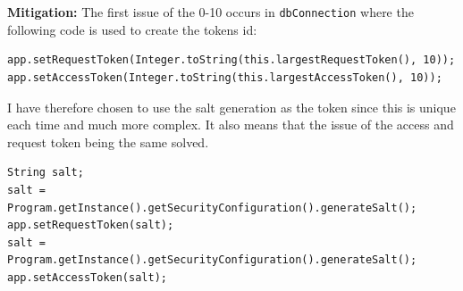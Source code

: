 \\ \\
\textbf{Mitigation:} The first issue of the 0-10 occurs in \verb|dbConnection| where the following code is used to create the tokens id:\\
\begin{verbatim}
app.setRequestToken(Integer.toString(this.largestRequestToken(), 10));
app.setAccessToken(Integer.toString(this.largestAccessToken(), 10));
\end{verbatim}
I have therefore chosen to use the salt generation as the token since this is unique each time and much more complex. It also means that the issue of the access and request token
being the same solved.
\begin{verbatim}
String salt;
salt = Program.getInstance().getSecurityConfiguration().generateSalt();
app.setRequestToken(salt);
salt = Program.getInstance().getSecurityConfiguration().generateSalt();
app.setAccessToken(salt);
\end{verbatim}